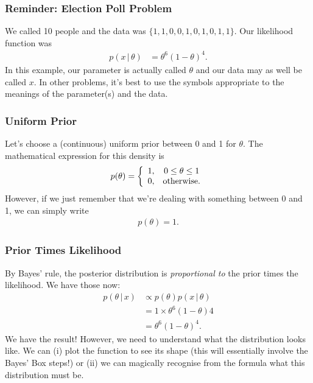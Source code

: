 \documentclass{beamer}
\newcommand{\given}{\,|\,}
\begin{document}
\begin{frame}
\frametitle{Reminder: Election Poll Problem}
We called 10 people and the data was
$\{1, 1, 0, 0, 1, 0, 1, 0, 1, 1\}$. Our likelihood function was
\begin{align}
p(x \given \theta) &= \theta^6(1-\theta)^4.
\end{align}
\pause
In this example, our parameter is actually called $\theta$ and our data may
as well be called $x$. In other problems, it's best to use the symbols
appropriate to the meanings of the parameter(s) and the data.
\end{frame}


\begin{frame}
\frametitle{Uniform Prior}
Let's choose a (continuous) uniform prior between 0 and 1 for $\theta$.
The mathematical expression for this density is
\begin{align}
p(\theta) = \left\{
                \begin{array}{cc}
                1, & 0 \leq \theta \leq 1 \\
                0, & \textnormal{otherwise}.
                \end{array}
            \right.
\end{align}
\pause
However, if we just remember that we're dealing with something between 0 and 1,
we can simply write
\begin{align}
p(\theta) = 1.
\end{align}

\end{frame}

\begin{frame}
\frametitle{Prior Times Likelihood}
By Bayes' rule, the posterior distribution is {\em proportional to}
the prior times the likelihood. We have those now:
\begin{align}
p(\theta \given x) &\propto p(\theta) p(x \given \theta) \\
                   &= 1 \times \theta^6(1-\theta)4 \\
                   &= \theta^6(1-\theta)^4.
\end{align}
\pause
We have the result! However, we need to understand what the distribution
looks like. We can (i) plot the function to see its shape (this will essentially
involve the Bayes' Box steps!) or (ii) we can magically recognise from the
formula what this distribution must be.

\end{frame}
\end{document}
